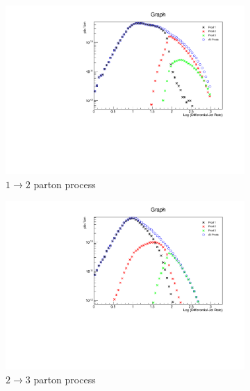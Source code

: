 \begin{figure} [thbp]
  \center
  \begin{subfigure}{0.48\linewidth}
    \includegraphics[width=\linewidth]{figures/monojet_appendix/HistoJet1to2_80.pdf}
    \caption{$1\rightarrow2$ parton process}
  \end{subfigure}
  \begin{subfigure}{0.48\linewidth}
    \includegraphics[width=\linewidth]{figures/monojet_appendix/HistoJet2to3_80.pdf}
    \caption{$2\rightarrow3$ parton process}
  \end{subfigure}
  \begin{subfigure}{0.48\linewidth}

\end{subfigure}
\end{figure}
